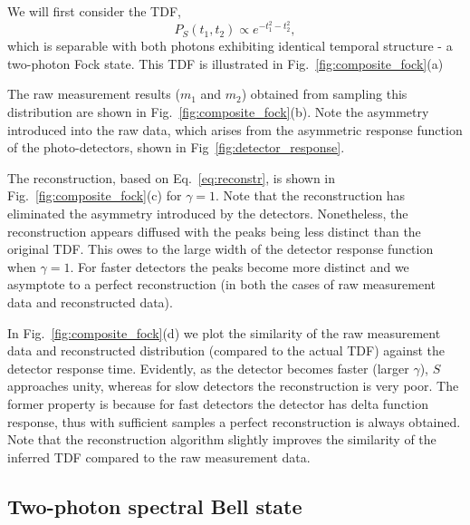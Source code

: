 \documentclass[aps,pra,twocolumn,amsmath,amssymb,color,superscriptaddress]{revtex4}
\begin{document}
We will first consider the TDF,
\begin{equation} \label{eq:spectral_gaussian}
P_S(t_{1}, t_{2}) \propto e^{-t_{1}^{2}-t_{2}^{2}},
\end{equation}
which is separable with both photons exhibiting identical temporal structure - a two-photon Fock state. This TDF is illustrated in Fig.~\ref{fig:composite_fock}(a)

The raw measurement results ($m_1$ and $m_2$) obtained from sampling this distribution are shown in Fig.~\ref{fig:composite_fock}(b). Note the asymmetry introduced into the raw data, which arises from the asymmetric response function of the photo-detectors, shown in Fig~\ref{fig:detector_response}.

The reconstruction, based on Eq.~\ref{eq:reconstr}, is shown in Fig.~\ref{fig:composite_fock}(c) for \mbox{$\gamma=1$}. Note that the reconstruction has eliminated the asymmetry introduced by the detectors. Nonetheless, the reconstruction appears diffused with the peaks being less distinct than the original TDF. This owes to the large width of the detector response function when \mbox{$\gamma=1$}. For faster detectors the peaks become more distinct and we asymptote to a perfect reconstruction (in both the cases of raw measurement data and reconstructed data).

In Fig.~\ref{fig:composite_fock}(d) we plot the similarity of the raw measurement data and reconstructed distribution (compared to the actual TDF) against the detector response time. Evidently, as the detector becomes faster (larger $\gamma$), $S$ approaches unity, whereas for slow detectors the reconstruction is very poor. The former property is because for fast detectors the detector has delta function response, thus with sufficient samples a perfect reconstruction is always obtained. Note that the reconstruction algorithm slightly improves the similarity of the inferred TDF compared to the raw measurement data.

%
%

\subsection{Two-photon spectral Bell state}
\end{document}
